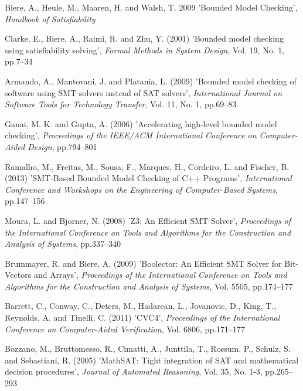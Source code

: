 \documentclass{doublecol-new}
\theoremstyle{TH}{
\newtheorem{lemma}{Lemma}
\newtheorem{theorem}[lemma]{Theorem}
\newtheorem{corrolary}[lemma]{Corrolary}
\newtheorem{conjecture}[lemma]{Conjecture}
\newtheorem{proposition}[lemma]{Proposition}
\newtheorem{claim}[lemma]{Claim}
\newtheorem{stheorem}[lemma]{Wrong Theorem}
\newtheorem{algorithm}{Algorithm}
}
\theoremstyle{THrm}{
\newtheorem{definition}{Definition}[section]
\newtheorem{question}{Question}[section]
\newtheorem{remark}{Remark}
\newtheorem{scheme}{Scheme}
}
\theoremstyle{THhit}{
\newtheorem{case}{Case}[section]
}
\begin{document}
\begin{thebibliography}{10}
Biere, A., Heule, M., Maaren, H. and Walsh, T. {2009} 'Bounded Model Checking', {\it Handbook of Satisfiability}

Clarke, E., Biere, A., Raimi, R. and Zhu, Y. (2001) 'Bounded model checking using satisfiability solving', {\it Formal Methods in System Design}, Vol. 19, No. 1, pp.7--34

Armando, A., Mantovani, J. and Platania, L. (2009) 'Bounded model checking of software using SMT solvers instead of SAT solvers', {\it International Journal on Software Tools for Technology Transfer}, Vol. 11, No. 1, pp.69--83

Ganai, M. K. and Gupta, A. (2006) 'Accelerating high-level bounded model checking', {\it Proceedings of the IEEE/ACM International Conference on Computer-Aided Design}, pp.794--801

Ramalho, M., Freitas, M., Sousa, F., Marques, H., Cordeiro, L. and Fischer, B. (2013) 'SMT-Based Bounded Model Checking of C++ Programs', {\it International Conference and Workshops on the Engineering of Computer-Based Systems}, pp.147--156

Moura, L. and Bjorner, N. (2008) 'Z3: An Efficient SMT Solver', {\it Proceedings of the International Conference on Tools and Algorithms for the Construction and Analysis of Systems}, pp.337--340

Brummayer, R. and Biere, A. (2009) 'Boolector: An Efficient SMT Solver for Bit-Vectors and Arrays', {\it Proceedings of the International Conference on Tools and Algorithms for the Construction and Analysis of Systems}, Vol. 5505, pp.174--177

Barrett, C., Conway, C., Deters, M., Hadarean, L., Jovanovic, D., King, T., Reynolds, A. and Tinelli, C. (2011) 'CVC4', {\it Proceedings of the International Conference on Computer-Aided Verification}, Vol. 6806, pp.171--177

Bozzano, M., Bruttomesso, R., Cimatti, A., Junttila, T., Rossum, P., Schulz, S. and Sebastiani, R. (2005) 'MathSAT: Tight integration of SAT and mathematical decision procedures', {\it Journal of Automated Reasoning}, Vol. 35, No. 1-3, pp.265--293


\end{thebibliography}
\end{document}
